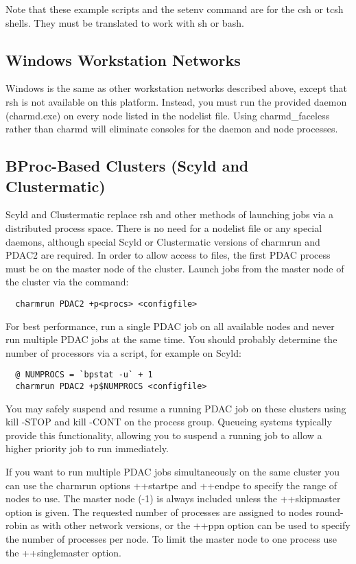 Note that these example scripts and the setenv command are for the csh
or tcsh shells.  They must be translated to work with sh or bash.

\subsection{Windows Workstation Networks}

Windows is the same as other workstation networks described above,
except that rsh is not available on this platform.  Instead, you must
run the provided daemon (charmd.exe) on every node listed in the
nodelist file.  Using charmd\_faceless rather than charmd will eliminate
consoles for the daemon and node processes.

\subsection{BProc-Based Clusters (Scyld and Clustermatic)}

Scyld and Clustermatic replace rsh and other methods of launching jobs
via a distributed process space.  There is no need for a nodelist file
or any special daemons, although special Scyld or Clustermatic versions
of charmrun and PDAC2 are required.  In order to allow access to files,
the first PDAC process must be on the master node of the cluster.
Launch jobs from the master node of the cluster via the command:

\begin{verbatim}
  charmrun PDAC2 +p<procs> <configfile>
\end{verbatim}

For best performance, run a single PDAC job on all available nodes and
never run multiple PDAC jobs at the same time.  You should probably
determine the number of processors via a script, for example on Scyld:

\begin{verbatim}
  @ NUMPROCS = `bpstat -u` + 1
  charmrun PDAC2 +p$NUMPROCS <configfile>
\end{verbatim}

You may safely suspend and resume a running PDAC job on these clusters
using kill -STOP and kill -CONT on the process group.  Queueing systems
typically provide this functionality, allowing you to suspend a running
job to allow a higher priority job to run immediately.

If you want to run multiple PDAC jobs simultaneously on the same cluster
you can use the charmrun options ++startpe and ++endpe to specify the
range of nodes to use.  The master node (-1) is always included unless
the ++skipmaster option is given.  The requested number of processes are
assigned to nodes round-robin as with other network versions, or the
++ppn option can be used to specify the number of processes per node.
To limit the master node to one process use the ++singlemaster option.

